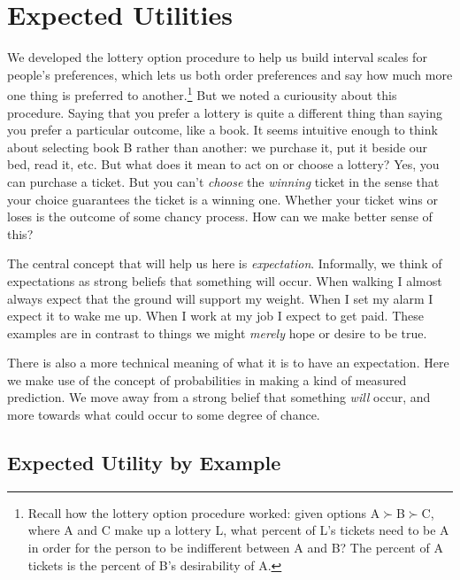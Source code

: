\documentclass[]{tufte-book}
\begin{document}
\hypertarget{expected-utilities}{%
\chapter{Expected Utilities}\label{expected-utilities}}

We developed the lottery option procedure to help us build interval scales for people's preferences, which lets us both order preferences and say how much more one thing is preferred to another.\footnote{Recall how the lottery option procedure worked: given options A\(\succ\)B\(\succ\)C, where A and C make up a lottery L, what percent of L's tickets need to be A in order for the person to be indifferent between A and B? The percent of A tickets is the percent of B's desirability of A.} But we noted a curiousity about this procedure. Saying that you prefer a lottery is quite a different thing than saying you prefer a particular outcome, like a book. It seems intuitive enough to think about selecting book B rather than another: we purchase it, put it beside our bed, read it, etc. But what does it mean to act on or choose a lottery? Yes, you can purchase a ticket. But you can't \emph{choose} the \emph{winning} ticket in the sense that your choice guarantees the ticket is a winning one. Whether your ticket wins or loses is the outcome of some chancy process. How can we make better sense of this?

The central concept that will help us here is \emph{expectation}. Informally, we think of expectations as strong beliefs that something will occur. When walking I almost always expect that the ground will support my weight. When I set my alarm I expect it to wake me up. When I work at my job I expect to get paid. These examples are in contrast to things we might \emph{merely} hope or desire to be true.

There is also a more technical meaning of what it is to have an expectation. Here we make use of the concept of probabilities in making a kind of measured prediction. We move away from a strong belief that something \emph{will} occur, and more towards what could occur to some degree of chance.

\hypertarget{expected-utility-by-example}{%
\section{Expected Utility by Example}\label{expected-utility-by-example}}
\end{document}
